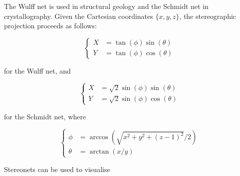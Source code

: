 The Wulff net is used in structural geology and the Schmidt net in
crystallography. Given the Cartesian coordinates $\{x,y,z\}$, the
stereographic projection proceeds as follows:

\begin{equation}
  \left\{
  \begin{split}
    X & = \tan(\phi) \sin(\theta) \\
    Y & = \tan(\phi) \cos(\theta)
  \end{split}
  \right.
\end{equation}

\noindent for the Wulff net, and 

\begin{equation}
  \left\{
  \begin{split}
    X & = \sqrt{2}\sin(\phi)\sin(\theta) \\
    Y & = \sqrt{2}\sin(\phi)\cos(\theta)
  \end{split}
  \right.
\end{equation}

\noindent for the Schmidt net, where

\begin{equation}
  \left\{
  \begin{split}
    \phi & = \arccos\left(\sqrt{{x^2+y^2+(z-1)^2}}/{2}\right) \\
    \theta & = \arctan\left({x}/{y}\right)
  \end{split}
  \right.
\end{equation}

Stereonets can be used to visualise

